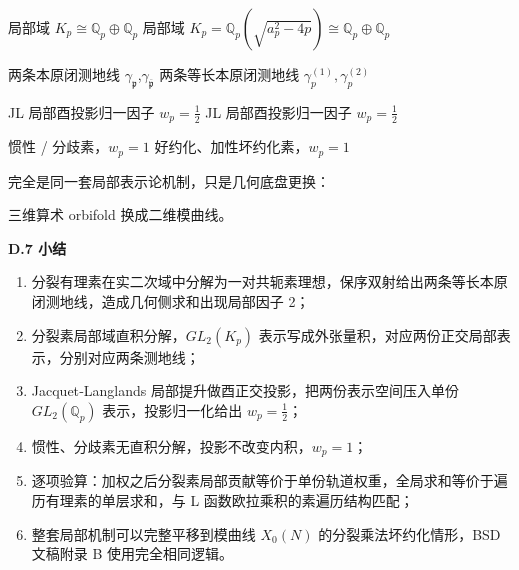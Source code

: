 \documentclass[11pt,a4paper]{ctexart}
\begin{document}
\textbar{} 局部域 \(K_{p} \cong \mathbb{Q}_{p} \oplus \mathbb{Q}_{p}\)
\textbar{} 局部域
\(K_{p} = \mathbb{Q}_{p}\left( \sqrt{a_{p}^{2} - 4p} \right) \cong \mathbb{Q}_{p} \oplus \mathbb{Q}_{p}\)
\textbar{}

\textbar{} 两条本原闭测地线
\(\gamma_{\mathfrak{p}}\),\(\gamma_{\overline{\mathfrak{p}}}\)
\textbar{} 两条等长本原闭测地线 \(\gamma_{p}^{(1)},\gamma_{p}^{(2)}\)
\textbar{}

\textbar JL 局部酉投影归一因子 \(w_{p} = \frac{1}{2}\) \textbar{} JL
局部酉投影归一因子 \(w_{p} = \frac{1}{2}\)\textbar{}

\textbar{} 惯性 / 分歧素，\(w_{p} = 1\) \textbar{}
好约化、加性坏约化素，\(w_{p} = 1\) \textbar{}

完全是同一套局部表示论机制，只是几何底盘更换：

三维算术 orbifold 换成二维模曲线。

\textbf{D.7 小结}

\begin{enumerate}
\def\labelenumi{\arabic{enumi}.}
\item
  分裂有理素在实二次域中分解为一对共轭素理想，保序双射给出两条等长本原闭测地线，造成几何侧求和出现局部因子
  2；
\item
  分裂素局部域直积分解，\({GL}_{2}\left( K_{p} \right)\)
  表示写成外张量积，对应两份正交局部表示，分别对应两条测地线；
\item
  Jacquet‑Langlands 局部提升做酉正交投影，把两份表示空间压入单份
  \({GL}_{2}\left( \mathbb{Q}_{p} \right)\) 表示，投影归一化给出
  \(w_{p} = \frac{1}{2}\)；
\item
  惯性、分歧素无直积分解，投影不改变内积，\(w_{p} = 1\)；
\item
  逐项验算：加权之后分裂素局部贡献等价于单份轨道权重，全局求和等价于遍历有理素的单层求和，与
  L 函数欧拉乘积的素遍历结构匹配；
\item
  整套局部机制可以完整平移到模曲线 \(X_{0}(N)\)
  的分裂乘法坏约化情形，BSD 文稿附录 B 使用完全相同逻辑。
\end{enumerate}
\end{document}
